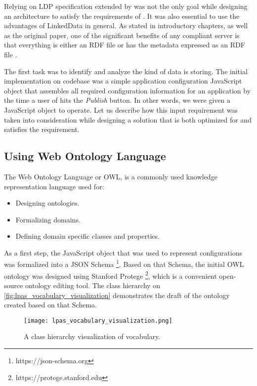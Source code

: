 Relying on LDP specification extended by \solid{} was not the only goal while designing an architecture to satisfy the requirements of \lpa{}. It was also essential to use the advantages of LinkedData in general. As stated in introductory chapters, as well as the original paper, one of the significant benefits of any \solid{} compliant server is that everything is either an RDF file or has the metadata expressed as an RDF file \cite{Solid:OriginalPaper}.  

The first task was to identify and analyze the kind of data \lpa{} is storing. The initial implementation on \lpa{} codebase was a simple application configuration JavaScript object that assembles all required configuration information for an application by the time a user of \lpa{} hits the \textit{Publish} button. In other words, we were given a JavaScript object to operate. Let us describe how this input requirement was taken into consideration while designing a solution that is both optimized for \solid{} and satisfies the requirement. 


\subsection{Using Web Ontology Language}
\label{sssec:using_web_ontology_language}

The Web Ontology Language or OWL, is a commonly used knowledge representation language used for:
\begin{itemize}
	\item Designing ontologies.
	\item Formalizing domains.
	\item Defining domain specific classes and properties.
\end{itemize}

As a first step, the JavaScript object that was used to represent \lpa{} configurations was formalized into a JSON Schema \footnote{https://json-schema.org}. Based on that Schema, the initial OWL ontology was designed using Stanford Protege \footnote{https://protege.stanford.edu}, which is a convenient open-source ontology editing tool. The class hierarchy on \autoref{fig:lpas_vocabulary_visualization} demonstrates the draft of the ontology created based on that Schema.

\begin{figure}[h]
\centering
\texttt{[image: lpas\_vocabulary\_visualization.png]}
\caption{A class hierarchy visualization of \lpa{} vocabulary.}
\label{fig:lpas_vocabulary_visualization}
\end{figure}

